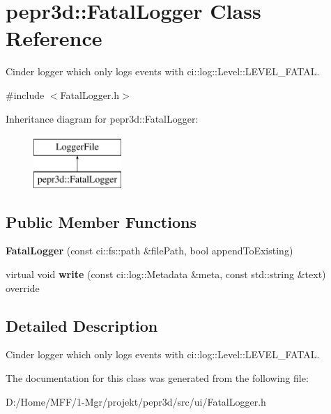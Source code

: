 \hypertarget{classpepr3d_1_1_fatal_logger}{}\section{pepr3d\+::Fatal\+Logger Class Reference}
\label{classpepr3d_1_1_fatal_logger}


Cinder logger which only logs events with ci\+::log\+::\+Level\+::\+L\+E\+V\+E\+L\+\_\+\+F\+A\+T\+AL.  




{\ttfamily \#include $<$Fatal\+Logger.\+h$>$}

Inheritance diagram for pepr3d\+::Fatal\+Logger\+:\begin{figure}[H]
\begin{center}
\leavevmode
\includegraphics[height=2.000000cm]{classpepr3d_1_1_fatal_logger}
\end{center}
\end{figure}
\subsection*{Public Member Functions}
\begin{DoxyCompactItemize}
\item 
\mbox{\label{classpepr3d_1_1_fatal_logger_a3acfbb566a2789d79e525ee36540987c}} 
{\bfseries Fatal\+Logger} (const ci\+::fs\+::path \&file\+Path, bool append\+To\+Existing)
\item 
\mbox{\label{classpepr3d_1_1_fatal_logger_a0d923495ed7ab58734f89e40caf7f321}} 
virtual void {\bfseries write} (const ci\+::log\+::\+Metadata \&meta, const std\+::string \&text) override
\end{DoxyCompactItemize}


\subsection{Detailed Description}
Cinder logger which only logs events with ci\+::log\+::\+Level\+::\+L\+E\+V\+E\+L\+\_\+\+F\+A\+T\+AL. 

The documentation for this class was generated from the following file\+:\begin{DoxyCompactItemize}
\item 
D\+:/\+Home/\+M\+F\+F/1-\/\+Mgr/projekt/pepr3d/src/ui/Fatal\+Logger.\+h\end{DoxyCompactItemize}

